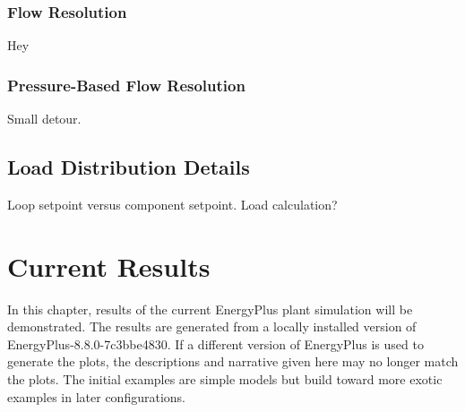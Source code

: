 \documentclass{report}
\begin{document}
            \subsection{Flow Resolution}\label{subsec:modeling-flow-resolver}
                Hey

            \subsection{Pressure-Based Flow Resolution}\label{subsec:modeling-flow-pressure}
                Small detour.

        \section{Load Distribution Details}\label{sec:modeling-dispatch}

            Loop setpoint versus component setpoint.
            Load calculation?


    \chapter{Current Results}\label{ch:current}

        In this chapter, results of the current EnergyPlus plant simulation will be demonstrated.
        The results are generated from a locally installed version of EnergyPlus-8.8.0-7c3bbe4830.
        If a different version of EnergyPlus is used to generate the plots, the descriptions and narrative given here may no longer match the plots.
        The initial examples are simple models but build toward more exotic examples in later configurations.
\end{document}

